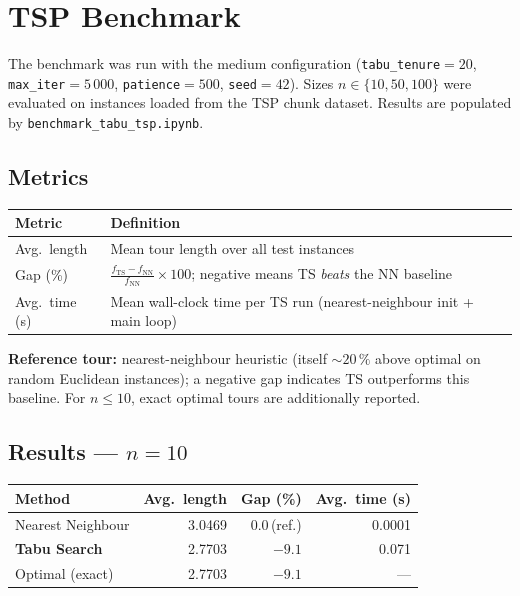 \documentclass[12pt,a4paper]{article}
\begin{document}
\section{TSP Benchmark}

The benchmark was run with the medium configuration
(\texttt{tabu\_tenure}$=20$, \texttt{max\_iter}$=5\,000$,
\texttt{patience}$=500$, \texttt{seed}$=42$).
Sizes $n \in \{10, 50, 100\}$ were evaluated on instances loaded from the TSP
chunk dataset.
Results are populated by \texttt{benchmark\_tabu\_tsp.ipynb}.

\subsection*{Metrics}

\begin{center}
\begin{tabularx}{\linewidth}{lX}
\toprule
\textbf{Metric} & \textbf{Definition} \\
\midrule
Avg.\ length & Mean tour length over all test instances \\
Gap (\%) & $\frac{f_{\mathrm{TS}} - f_{\mathrm{NN}}}{f_{\mathrm{NN}}} \times 100$;
  negative means TS \emph{beats} the NN baseline \\
Avg.\ time (s) & Mean wall-clock time per TS run (nearest-neighbour init
  + main loop) \\
\bottomrule
\end{tabularx}
\end{center}

\textbf{Reference tour:}
nearest-neighbour heuristic (itself ${\sim}20\,\%$ above optimal on random
Euclidean instances); a negative gap indicates TS outperforms this baseline.
For $n \leq 10$, exact optimal tours are additionally reported.

\subsection*{Results --- $n = 10$}

\begin{center}
\begin{tabularx}{\linewidth}{Xrrr}
\toprule
\textbf{Method} & \textbf{Avg.\ length} & \textbf{Gap (\%)} & \textbf{Avg.\ time (s)} \\
\midrule
Nearest Neighbour     & 3.0469 & 0.0\,(ref.)  & 0.0001 \\
\textbf{Tabu Search}  & 2.7703 & $-9.1$      & 0.071  \\
Optimal (exact)       & 2.7703 & $-9.1$      & ---    \\
\bottomrule
\end{tabularx}
\end{center}
\end{document}
